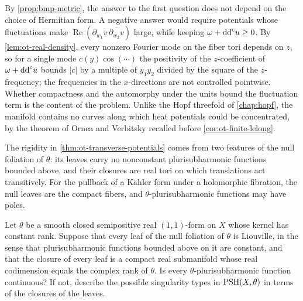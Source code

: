 By \cref{prop:bmp-metric}, the answer to the first question does not depend on the choice of Hermitian form. A negative answer would require potentials whose fluctuations make $\operatorname{Re}(\partial_{w_1}v\,\overline{\partial_{w_2}v})$ large, while keeping $\omega+\mathrm{dd}^{\mathrm{c}} u\geq0$. By \cref{lem:ot-real-density}, every nonzero Fourier mode on the fiber tori depends on $z$, so for a single mode $c(y)\cos(\cdots)$ the positivity of the $z$-coefficient of $\omega+\mathrm{dd}^{\mathrm{c}} u$ bounds $|c|$ by a multiple of $y_1y_2$ divided by the square of the $z$-frequency; the frequencies in the $x$-directions are not controlled pointwise. Whether compactness and the automorphy under the units bound the fluctuation term is the content of the problem. Unlike the Hopf threefold of \cref{chap:hopf}, the manifold contains no curves along which heat potentials could be concentrated, by the theorem of Ornea and Verbitsky recalled before \cref{cor:ot-finite-lelong}.

The rigidity in \cref{thm:ot-transverse-potentials} comes from two features of the null foliation of $\theta$: its leaves carry no nonconstant plurisubharmonic functions bounded above, and their closures are real tori on which translations act transitively. For the pullback of a K\"ahler form under a holomorphic fibration, the null leaves are the compact fibers, and $\theta$-plurisubharmonic functions may have poles.

\begin{problem}\label{qu:foliated-rigidity}
Let $\theta$ be a smooth closed semipositive real $(1,1)$-form on $X$ whose kernel has constant rank. Suppose that every leaf of the null foliation of $\theta$ is Liouville, in the sense that plurisubharmonic functions bounded above on it are constant, and that the closure of every leaf is a compact real submanifold whose real codimension equals the complex rank of $\theta$. Is every $\theta$-plurisubharmonic function continuous? If not, describe the possible singularity types in $\mathrm{PSH}(X,\theta)$ in terms of the closures of the leaves.
\end{problem}
